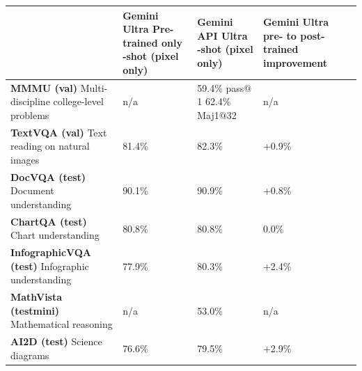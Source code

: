 \begin{table}[ht!]
    \setlength{\tabcolsep}{6pt}
    \centering
    \scriptsize
\begin{tabular}{p{3.5cm}p{2cm}p{2cm}p{2.3cm}}
\toprule
 & Gemini Ultra \newline Pre-trained only \newline 0-shot \newline \tiny{(pixel only)} & Gemini API Ultra \newline 0-shot \newline \tiny{(pixel only)} & Gemini Ultra \newline pre- to post-trained \newline improvement \\
\midrule
\textbf{MMMU (val)} \newline \tiny{Multi-discipline college-level problems \citep{mmmu}} & n/a & 59.4\% \newline \tiny{pass$@$1} \newline \newline \scriptsize{62.4\%} \newline \tiny{Maj1$@$32} & n/a \\
\addlinespace[1ex]
\textbf{TextVQA (val)} \newline \tiny{Text reading on natural images \newline \citep{textvqa}} & 81.4\% & 82.3\% & +0.9\% \\
\addlinespace[1ex]
\textbf{DocVQA (test)} \newline \tiny{Document understanding \newline\citep{docvqa}} &    90.1\% & 90.9\% & +0.8\%  \\
\addlinespace[2ex]
\textbf{ChartQA (test)} \newline \tiny{Chart understanding \newline \citep{chartqa}} & 80.8\% & 80.8\%  & 0.0\% \\
\addlinespace[1ex]
\textbf{InfographicVQA (test)} \newline \tiny{Infographic understanding \newline \citep{infographicvqa}} & 77.9\% & 80.3\% & +2.4\% \\
\addlinespace[1ex]
\textbf{MathVista (testmini)} \newline \tiny{Mathematical reasoning \newline \citep{MathVista}} & n/a & 53.0\% & n/a \\
\addlinespace[1ex]
\textbf{AI2D (test)} \newline \tiny{Science diagrams \newline\citep{ai2d}} & 76.6\% & 79.5\% & +2.9\% \\

\end{tabular}
\end{table}
